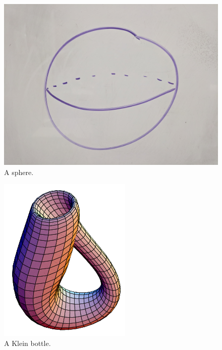 \documentclass[10pt,]{article}
\begin{document}
\begin{figure}
\centering
\includegraphics[width=1\linewidth]{images/sphere.jpg}
\caption{A sphere.\label{figure-sphere}}
\end{figure}
\begin{figure}
\centering
\includegraphics[width=1\linewidth]{images/klein-bottle.png}
\caption{A Klein bottle.\label{figure-klein-bottle}}
\end{figure}
\end{document}
